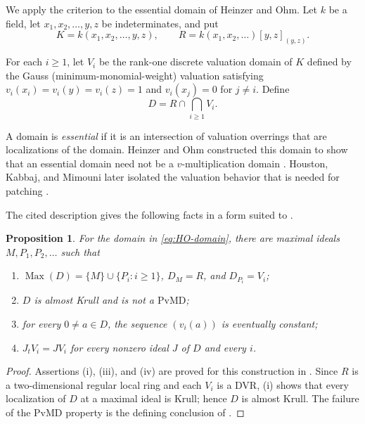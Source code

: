 \documentclass[11pt]{amsart}
\newtheorem{proposition}[proposition]{Proposition}
\theoremstyle{definition}
\theoremstyle{remark}
\newcommand{\PvMD}{\mathrm{PvMD}}
\newcommand{\Max}{\operatorname{Max}}
\begin{document}
We apply the criterion to the essential domain of Heinzer and Ohm.  Let $k$
be a field, let $x_1,x_2,\ldots,y,z$ be indeterminates, and put
\begin{equation}\label{eq:HO-data}
 K=k(x_1,x_2,\ldots,y,z),
 \qquad
 R=k(x_1,x_2,\ldots)[y,z]_{(y,z)}.
\end{equation}

For each $i\geq1$, let $V_i$ be the rank-one discrete valuation domain of
$K$ defined by the Gauss (minimum-monomial-weight) valuation satisfying
$v_i(x_i)=v_i(y)=v_i(z)=1$ and $v_i(x_j)=0$ for $j\ne i$.  Define
\begin{equation}\label{eq:HO-domain}
 D=R\cap\bigcap_{i\geq1}V_i.
\end{equation}

A domain is \emph{essential} if it is an intersection of valuation
overrings that are localizations of the domain.  Heinzer and Ohm constructed
this domain to show that an essential domain need not be a
$v$-multiplication domain \cite{HeinzerOhm}.  Houston, Kabbaj, and
Mimouni later isolated the valuation behavior that is needed for patching
\cite[Example~3.3]{HoustonKabbajMimouni}.

The cited description gives the following facts in a form suited to
.

\begin{proposition}\label{prop:HO}
For the domain in \eqref{eq:HO-domain}, there are maximal ideals
$M,P_1,P_2,\ldots$ such that
\begin{enumerate}[label=\textup{(\roman*)}]
\item $\Max(D)=\{M\}\cup\{P_i:i\geq1\}$, $D_M=R$, and $D_{P_i}=V_i$;
\item $D$ is almost Krull and is not a $\PvMD$;
\item for every $0\ne a\in D$, the sequence $(v_i(a))$ is eventually
      constant;
\item $J_tV_i=JV_i$ for every nonzero ideal $J$ of $D$ and every $i$.
\end{enumerate}
\end{proposition}

\begin{proof}
Assertions (i), (iii), and (iv) are proved for this construction in
\cite[Example~3.3]{HoustonKabbajMimouni}.  Since $R$ is a two-dimensional
regular local ring and each $V_i$ is a DVR, (i) shows that every localization
of $D$ at a maximal ideal is Krull; hence $D$ is almost Krull.  The failure of
the $\PvMD$ property is the defining conclusion of
\cite{HeinzerOhm}.
\end{proof}
\end{document}
